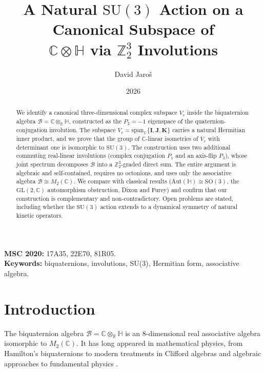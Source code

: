 \documentclass[12pt,a4paper]{article}
\title{%
  A Natural $\mathrm{SU}(3)$ Action on a Canonical Subspace of\\
  $\mathbb{C}\otimes\mathbb{H}$ via $\mathbb{Z}_2^3$ Involutions
}
\author{David Jaro\v{s}}
\date{2026}
\theoremstyle{remark}
\begin{document}
\maketitle

\begin{abstract}
We identify a canonical three-dimensional complex subspace $V_c$ inside the
biquaternion algebra $\mathcal{B} = \mathbb{C}\otimes_\mathbb{R}\mathbb{H}$,
constructed as the $P_2=-1$ eigenspace of the quaternion-conjugation involution.
The subspace $V_c = \mathrm{span}_\mathbb{C}\{\mathbf{I},\mathbf{J},\mathbf{K}\}$
carries a natural Hermitian inner product, and we prove that the group of
$\mathbb{C}$-linear isometries of $V_c$ with determinant one is isomorphic to
$\mathrm{SU}(3)$.  The construction uses two additional commuting real-linear
involutions (complex conjugation $P_1$ and an axis-flip $P_3$), whose joint
spectrum decomposes $\mathcal{B}$ into a $\mathbb{Z}_2^3$-graded direct sum.
The entire argument is algebraic and self-contained, requires no octonions, and
uses only the associative algebra $\mathcal{B}\cong M_2(\mathbb{C})$.
We compare with classical results ($\mathrm{Aut}(\mathbb{H})\cong\mathrm{SO}(3)$,
the $\mathrm{GL}(2,\mathbb{C})$ automorphism obstruction, Dixon and Furey) and
confirm that our construction is complementary and non-contradictory.
Open problems are stated, including whether the $\mathrm{SU}(3)$ action
extends to a dynamical symmetry of natural kinetic operators.
\end{abstract}

\noindent\textbf{MSC 2020:} 17A35, 22E70, 81R05.\\
\noindent\textbf{Keywords:} biquaternions, involutions, SU(3), Hermitian form, associative algebra.

\tableofcontents

\section{Introduction}
\label{sec:intro}

The biquaternion algebra $\mathcal{B} = \mathbb{C}\otimes_\mathbb{R}\mathbb{H}$
is an 8-dimensional real associative algebra isomorphic to $M_2(\mathbb{C})$.
It has long appeared in mathematical physics, from Hamilton's biquaternions
\cite{Hamilton1866} to modern treatments in Clifford algebras \cite{Porteous1995}
and algebraic approaches to fundamental physics \cite{Dixon1994,Furey2016}.
\end{document}
